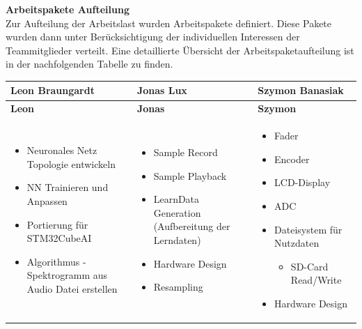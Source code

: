 \textbf{Arbeitspakete Aufteilung} \\
Zur Aufteilung der Arbeitslast wurden Arbeitspakete definiert. Diese Pakete wurden dann unter Berücksichtigung der individuellen Interessen der Teammitglieder verteilt. Eine detaillierte Übersicht der Arbeitspaketaufteilung ist in der nachfolgenden Tabelle zu finden.
\begin{longtable}[c]{|p{5cm}|p{5cm}|p{5cm}|}
	\hline
	\textbf{Leon Braungardt} & \textbf{Jonas Lux} & \textbf{Szymon Banasiak}\\
	\hline
	\endfirsthead
	\hline
	\textbf{Leon} & \textbf{Jonas} & \textbf{Szymon}\\
	\hline
	\endhead
	\hline
	\endfoot
	\hline
	\endlastfoot
	
	\begin{itemize}[left=0pt]
		\item Neuronales Netz Topologie entwickeln
		\item NN Trainieren und Anpassen
		\item Portierung für STM32CubeAI
		\item Algorithmus - Spektrogramm aus Audio Datei erstellen
	\end{itemize} &
	\begin{itemize}[left=0pt]
		\item Sample Record
		\item Sample Playback
		\item LearnData Generation (Aufbereitung der Lerndaten)
		\item Hardware Design
		\item Resampling
	\end{itemize} &
	\begin{itemize}[left=0pt]
		\item Fader
		\item Encoder
		\item LCD-Display
		\item ADC
		\item Dateisystem für Nutzdaten
		\begin{itemize}[label=--, left=1em]
			\item SD-Card Read/Write
		\end{itemize}
		\item Hardware Design
	\end{itemize} \\
	\hline
\end{longtable}